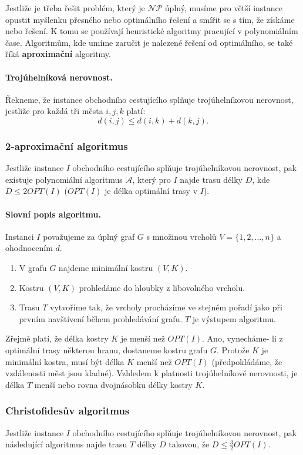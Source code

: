 Jestliže je třeba řešit problém, který je $\mathcal{NP}$ úplný, musíme pro větší instance opustit myšlenku přesného nebo optimálního řešení a smířit se s tím, že získáme  nebo  řešení. K tomu se používají heuristické algoritmy pracující v polynomiálním čase. Algoritmům, kde umíme zaručit  je nalezené řešení od optimálního, se také říká \textbf{aproximační} algoritmy.

\paragraph{Trojúhelníková nerovnost.} Řekneme, že instance obchodního cestujícího splňuje trojúhelníkovou nerovnost, jestliže pro každá tři města $i,j,k$ platí:$$d(i, j) \leq d(i, k) + d(k, j).$$

\subsubsection{2-aproximační algoritmus}
Jestliže instance $I$ obchodního cestujícího splňuje trojúhelníkovou nerovnost, pak existuje polynomiální algoritmus $\mathcal{A}$, který pro $I$ najde trasu délky $D$, kde $D \leq 2OPT(I)$ ($OPT(I)$ je délka optimální trasy v $I$).

\paragraph{Slovní popis algoritmu.} Instanci $I$ považujeme za úplný graf $G$ s množinou vrcholů $V = \{1, 2, \hdots , n\}$ a ohodnocením $d$.
\begin{enumerate}[itemsep=0pt]    \item V grafu $G$ najdeme minimální kostru $(V,K)$.    \item Kostru $(V,K)$ prohledáme do hloubky z libovolného vrcholu.    \item Trasu $T$ vytvoříme tak, že vrcholy procházíme ve stejném pořadí jako při prvním navštívení během prohledávání grafu. $T$ je výstupem algoritmu.
\end{enumerate}Zřejmě platí, že délka kostry $K$ je menší než $OPT(I)$. Ano, vynecháme- li z optimální trasy některou hranu, dostaneme kostru grafu $G$. Protože $K$ je minimální kostra, musí být délka $K$ menší než $OPT(I)$ (předpokládáme, že vzdálenosti měst jsou kladné). Vzhledem k platnosti trojúhelníkové nerovnosti, je délka $T$ menší nebo rovna dvojnásobku délky kostry $K$.

\subsubsection{Christofidesův algoritmus}
Jestliže instance $I$ obchodního cestujícího splňuje trojúhelníkovou nerovnost, pak následující algoritmus najde trasu $T$ délky $D$ takovou, že $D \leq \frac{3}{2} OPT(I)$.


